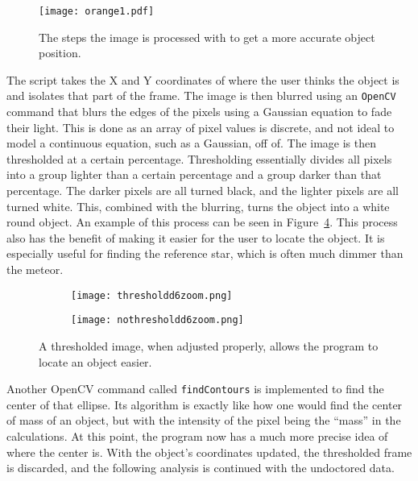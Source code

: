 \begin{figure}[h!]
	\centering
	\texttt{[image: orange1.pdf]}
	\caption{The steps the image is processed with to get a more accurate object position.}
	\label{fig:contourfinder}
\end{figure}

The script takes the X and Y coordinates of where the user thinks the object is and isolates that part of the frame. The image is then blurred using an \texttt{OpenCV} command that blurs the edges of the pixels using a Gaussian equation to fade their light. This is done as an array of pixel values is discrete, and not ideal to model a continuous equation, such as a Gaussian, off of. The image is then thresholded at a certain percentage. Thresholding essentially divides all pixels into a group lighter than a certain percentage and a group darker than that percentage. The darker pixels are all turned black, and the lighter pixels are all turned white. This, combined with the blurring, turns the object into a white round object. An example of this process can be seen in Figure~\ref{fig:ThresholdComparison}. This process also has the benefit of making it easier for the user to locate the object. It is especially useful for finding the reference star, which is often much dimmer than the meteor. 
\begin{figure}
\centering
\begin{subfigure}{.4\textwidth}
  \centering
  \texttt{[image: thresholdd6zoom.png]}
  \label{fig:nothresholdd6}
\end{subfigure}%
\begin{subfigure}{.4\textwidth}
  \centering
  \texttt{[image: nothresholdd6zoom.png]}
  \label{fig:thresholdd6}
\end{subfigure}
\caption{A thresholded image, when adjusted properly, allows the program to locate an object easier.}
\label{fig:ThresholdComparison}
\end{figure}

Another OpenCV command called \texttt{findContours} is implemented to find the center of that ellipse. Its algorithm is exactly like how one would find the center of mass of an object, but with the intensity of the pixel being the ``mass'' in the calculations. At this point, the program now has a much more precise idea of where the center is. With the object's coordinates updated, the thresholded frame is discarded, and the following analysis is continued with the undoctored data. 

